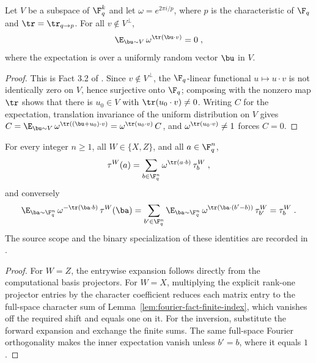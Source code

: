 \begin{lemma}\label{lem:cancellation}
	\leanok
	Let $V$ be a subspace of $\F_q^k$ and let $\omega = e^{2\pi i/p}$, where
	$p$ is the characteristic of $\F_q$ and $\tr = \tr_{q \to p}$. For all
	$v \notin V^\perp$,
	\[
		\E_{\bu \sim V}\, \omega^{\tr(\bu \cdot v)} = 0\;,
	\]
	where the expectation is over a uniformly random vector $\bu$ in $V$.
\end{lemma}
\begin{proof}
	\leanok
	This is Fact 3.2 of \cite{Natarajan2018NEEXP}. Since $v \notin V^\perp$,
	the $\F_q$-linear functional $u \mapsto u \cdot v$ is not identically zero
	on $V$, hence surjective onto $\F_q$; composing with the nonzero map $\tr$
	shows that there is $u_0 \in V$ with $\tr(u_0 \cdot v) \neq 0$. Writing $C$
	for the expectation, translation invariance of the uniform distribution on
	$V$ gives
	$C = \E_{\bu \sim V}\, \omega^{\tr((\bu + u_0) \cdot v)}
	= \omega^{\tr(u_0 \cdot v)}\, C$, and $\omega^{\tr(u_0 \cdot v)} \neq 1$
	forces $C = 0$.
\end{proof}

\begin{lemma}\label{lem:pauli-observable-expansion}
	\leanok
	For every integer $n \ge 1$, all $W \in \{X, Z\}$, and all $a \in \F_q^n$,
	\begin{equation}\label{eq:pauli-obs-proj}
		\tau^W(a) = \sum_{b \in \F_q^n} \omega^{\tr(a \cdot b)}\, \tau^W_b\;,
	\end{equation}
	and conversely
	\begin{equation}\label{eq:pauli-inversion-0}
		\E_{\ba \sim \F_q^n}\, \omega^{-\tr(\ba \cdot b)}\, \tau^W(\ba)
		= \sum_{b' \in \F_q^n} \E_{\ba \sim \F_q^n}\,
		\omega^{\tr(\ba \cdot (b' - b))}\, \tau^W_{b'}
		= \tau^W_b\;.
	\end{equation}
	The source scope and the binary specialization of these identities are
	recorded in \cite{gap:qpbt_characteristic-two-pauli-scope}.
\end{lemma}
\begin{proof}
	\leanok
	For $W=Z$, the entrywise expansion follows directly from the computational
	basis projectors. For $W=X$, multiplying the explicit rank-one projector
	entries by the character coefficient reduces each matrix entry to the
	full-space character sum of Lemma~\ref{lem:fourier-fact-finite-index}, which
	vanishes off the required shift and equals one on it. For the inversion,
	substitute the forward expansion and exchange the finite sums. The same
	full-space Fourier orthogonality makes the inner expectation vanish unless
	$b'=b$, where it equals $1$.
\end{proof}

